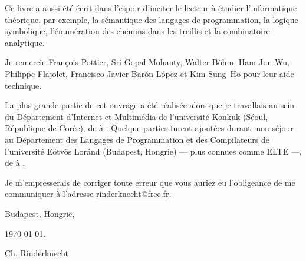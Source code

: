 Ce livre a aussi été écrit dans l'espoir d'inciter le lecteur à
étudier l'informatique théorique, par exemple, la sémantique des
langages de programmation, la logique symbolique, l'énumération des
chemins dans les treillis et la combinatoire analytique.

Je remercie Fran\c{c}ois Pottier, Sri Gopal Mohanty, Walter B\"ohm,
Ham Jun-Wu, Philippe Flajolet, Francisco Javier Bar\'on L\'opez et\!
Kim Sung~Ho pour leur aide technique.

La plus grande partie de cet ouvrage a été réalisée alors que je
travallais au sein du Département d'Internet et Multimédia de
l'université Konkuk (Séoul, République de Corée), de
 à . Quelque parties furent
ajoutées durant mon séjour au Département des Langages de
Programmation et des Compilateurs de l'université E\"otv\"os Lor\'and
(Budapest, Hongrie) --- plus connues comme ELTE ---, de
 à .

Je m'empresserais de corriger toute erreur que vous auriez eu
l'obligeance de me communiquer à l'adresse \url{rinderknecht@free.fr}.

\bigskip

\hfill{}Budapest, Hongrie,

\hfill\today.

\bigskip

\hfill{}Ch. Rinderknecht
